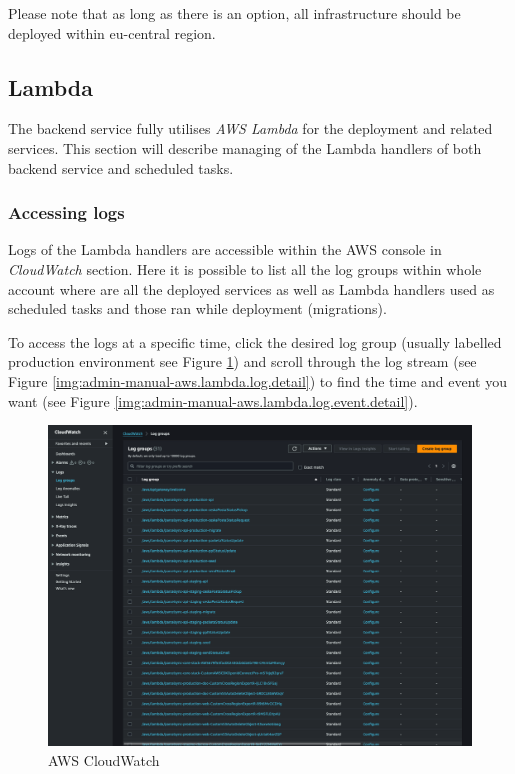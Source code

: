 Please note that as long as there is an option, all infrastructure should be deployed within eu-central region.

\subsection{Lambda}
The backend service fully utilises \textit{AWS Lambda} for the deployment and related services. 
This section will describe managing of the Lambda handlers of both backend service and scheduled tasks.

\subsubsection{Accessing logs}
Logs of the Lambda handlers are accessible within the AWS console in \textit{CloudWatch} section.
Here it is possible to list all the log groups within whole account where are all the deployed services as well as Lambda handlers used as scheduled tasks and those ran while deployment (migrations).

To access the logs at a specific time, click the desired log group (usually labelled production environment see Figure \ref{img:admin-manual-aws.lambda.log}) and scroll through the log stream (see Figure \ref{img:admin-manual-aws.lambda.log.detail}) to find the time and event you want (see Figure \ref{img:admin-manual-aws.lambda.log.event.detail}).

\begin{figure}[p]\centering
\includegraphics[width=140mm]{img/docs/fig_aws_cloudwatch.png}
\caption{AWS CloudWatch}
\label{img:admin-manual-aws.lambda.log}
\end{figure}

